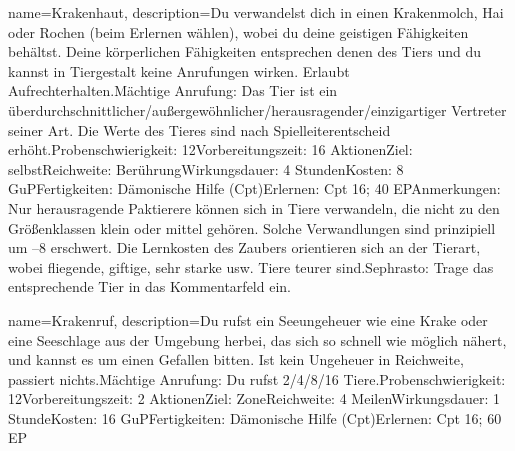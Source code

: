 {
    name={Krakenhaut},
    description={Du verwandelst dich in einen Krakenmolch, Hai oder Rochen (beim Erlernen wählen), wobei du deine geistigen Fähigkeiten behältst. Deine körperlichen Fähigkeiten entsprechen denen des Tiers und du kannst in Tiergestalt keine Anrufungen wirken. Erlaubt Aufrechterhalten.\newline Mächtige Anrufung: Das Tier ist ein überdurchschnittlicher/außergewöhnlicher/herausragender/einzigartiger Vertreter seiner Art. Die Werte des Tieres sind nach Spielleiterentscheid erhöht.\newline Probenschwierigkeit: 12\newline Vorbereitungszeit: 16 Aktionen\newline Ziel: selbst\newline Reichweite: Berührung\newline Wirkungsdauer: 4 Stunden\newline Kosten: 8 GuP\newline Fertigkeiten: Dämonische Hilfe (Cpt)\newline Erlernen: Cpt 16; 40 EP\newline Anmerkungen: Nur herausragende Paktierere können sich in Tiere verwandeln, die nicht zu den Größenklassen klein oder mittel gehören. Solche Verwandlungen sind prinzipiell um –8 erschwert. Die Lernkosten des Zaubers orientieren sich an der Tierart, wobei fliegende, giftige, sehr starke usw. Tiere teurer sind.\newline Sephrasto: Trage das entsprechende Tier in das Kommentarfeld ein.}
}


{
    name={Krakenruf},
    description={Du rufst ein Seeungeheuer wie eine Krake oder eine Seeschlage aus der Umgebung herbei, das sich so schnell wie möglich nähert, und kannst es um einen Gefallen bitten. Ist kein Ungeheuer in Reichweite, passiert nichts.\newline Mächtige Anrufung: Du rufst 2/4/8/16 Tiere.\newline Probenschwierigkeit: 12\newline Vorbereitungszeit: 2 Aktionen\newline Ziel: Zone\newline Reichweite: 4 Meilen\newline Wirkungsdauer: 1 Stunde\newline Kosten: 16 GuP\newline Fertigkeiten: Dämonische Hilfe (Cpt)\newline Erlernen: Cpt 16; 60 EP}
}


